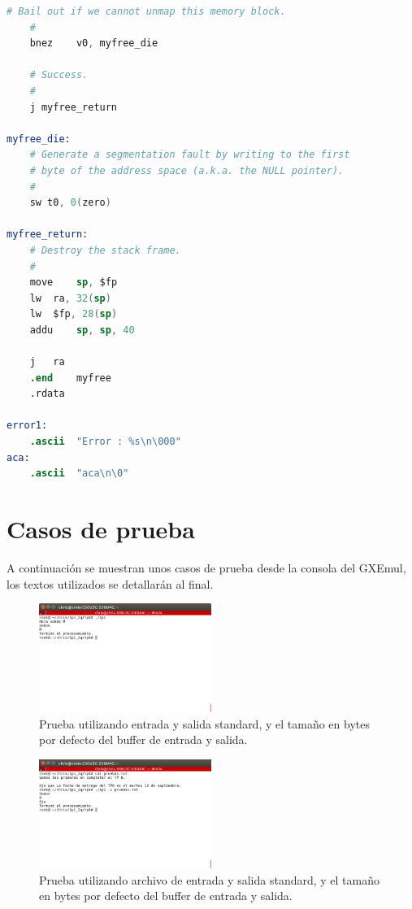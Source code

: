 \documentclass[a4paper]{article}
\begin{document}
\begin{lstlisting}[language=Assembler]
	# Bail out if we cannot unmap this memory block.
	#
	bnez	v0, myfree_die

	# Success.
	#
	j myfree_return

myfree_die:
	# Generate a segmentation fault by writing to the first
	# byte of the address space (a.k.a. the NULL pointer).
	#
	sw t0, 0(zero)

myfree_return:
	# Destroy the stack frame.
	#
	move	sp, $fp
	lw	ra, 32(sp)
	lw	$fp, 28(sp)
	addu	sp, sp, 40

	j	ra
	.end	myfree
	.rdata

error1:
	.ascii	"Error : %s\n\000"
aca:
	.ascii	"aca\n\0"

\end{lstlisting}

\section{Casos de prueba}

A continuación se muestran unos casos de prueba desde la consola del GXEmul, los textos utilizados se detallarán al final.


\begin{figure}[!htp]
\begin{center}
\includegraphics[width=0.5\textwidth]{imagenes_casosDePrueba_tp1/prueba0.png}
\caption{Prueba utilizando entrada y salida standard, y el tamaño en bytes por defecto del buffer de entrada y salida.} \label{fig001}
\end{center}
\end{figure}

\begin{figure}[!htp]
\begin{center}
\includegraphics[width=0.5\textwidth]{imagenes_casosDePrueba_tp1/prueba_1archivoDeEntrada.png}
\caption{Prueba utilizando archivo de entrada y salida standard, y el tamaño en bytes por defecto del buffer de entrada y salida.} \label{fig001}
\end{center}
\end{figure}
\end{document}

